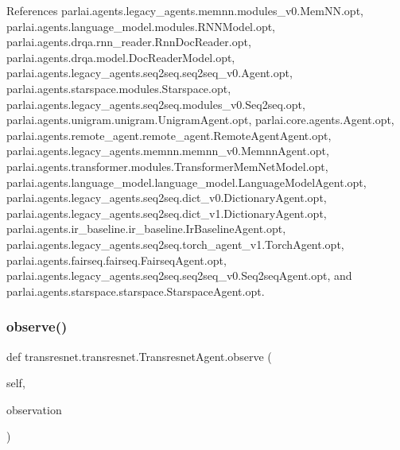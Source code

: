 References parlai.\+agents.\+legacy\+\_\+agents.\+memnn.\+modules\+\_\+v0.\+Mem\+N\+N.\+opt, parlai.\+agents.\+language\+\_\+model.\+modules.\+R\+N\+N\+Model.\+opt, parlai.\+agents.\+drqa.\+rnn\+\_\+reader.\+Rnn\+Doc\+Reader.\+opt, parlai.\+agents.\+drqa.\+model.\+Doc\+Reader\+Model.\+opt, parlai.\+agents.\+legacy\+\_\+agents.\+seq2seq.\+seq2seq\+\_\+v0.\+Agent.\+opt, parlai.\+agents.\+starspace.\+modules.\+Starspace.\+opt, parlai.\+agents.\+legacy\+\_\+agents.\+seq2seq.\+modules\+\_\+v0.\+Seq2seq.\+opt, parlai.\+agents.\+unigram.\+unigram.\+Unigram\+Agent.\+opt, parlai.\+core.\+agents.\+Agent.\+opt, parlai.\+agents.\+remote\+\_\+agent.\+remote\+\_\+agent.\+Remote\+Agent\+Agent.\+opt, parlai.\+agents.\+legacy\+\_\+agents.\+memnn.\+memnn\+\_\+v0.\+Memnn\+Agent.\+opt, parlai.\+agents.\+transformer.\+modules.\+Transformer\+Mem\+Net\+Model.\+opt, parlai.\+agents.\+language\+\_\+model.\+language\+\_\+model.\+Language\+Model\+Agent.\+opt, parlai.\+agents.\+legacy\+\_\+agents.\+seq2seq.\+dict\+\_\+v0.\+Dictionary\+Agent.\+opt, parlai.\+agents.\+legacy\+\_\+agents.\+seq2seq.\+dict\+\_\+v1.\+Dictionary\+Agent.\+opt, parlai.\+agents.\+ir\+\_\+baseline.\+ir\+\_\+baseline.\+Ir\+Baseline\+Agent.\+opt, parlai.\+agents.\+legacy\+\_\+agents.\+seq2seq.\+torch\+\_\+agent\+\_\+v1.\+Torch\+Agent.\+opt, parlai.\+agents.\+fairseq.\+fairseq.\+Fairseq\+Agent.\+opt, parlai.\+agents.\+legacy\+\_\+agents.\+seq2seq.\+seq2seq\+\_\+v0.\+Seq2seq\+Agent.\+opt, and parlai.\+agents.\+starspace.\+starspace.\+Starspace\+Agent.\+opt.

\mbox{\label{classtransresnet_1_1transresnet_1_1TransresnetAgent_a6490d77774f8b371ceba5546556e907b}} 
\subsubsection{\texorpdfstring{observe()}{observe()}}
{\footnotesize\ttfamily def transresnet.\+transresnet.\+Transresnet\+Agent.\+observe (\begin{DoxyParamCaption}\item[{}]{self,  }\item[{}]{observation }\end{DoxyParamCaption})}

